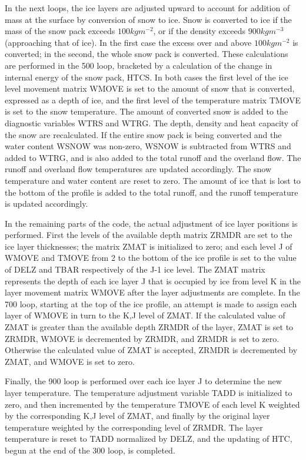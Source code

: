 In the next loops, the ice layers are adjusted upward to account for addition of mass at the surface by conversion of snow to ice. Snow is converted to ice if the mass of the snow pack exceeds $100 kg m^{-2}$, or if the density exceeds $900 kg m^{-3}$ (approaching that of ice). In the first case the excess over and above $100 kg m^{-2}$ is converted; in the second, the whole snow pack is converted. These calculations are performed in the 500 loop, bracketed by a calculation of the change in internal energy of the snow pack, H\+T\+C\+S. In both cases the first level of the ice level movement matrix W\+M\+O\+V\+E is set to the amount of snow that is converted, expressed as a depth of ice, and the first level of the temperature matrix T\+M\+O\+V\+E is set to the snow temperature. The amount of converted snow is added to the diagnostic variables W\+T\+R\+S and W\+T\+R\+G. The depth, density and heat capacity of the snow are recalculated. If the entire snow pack is being converted and the water content W\+S\+N\+O\+W was non-\/zero, W\+S\+N\+O\+W is subtracted from W\+T\+R\+S and added to W\+T\+R\+G, and is also added to the total runoff and the overland flow. The runoff and overland flow temperatures are updated accordingly. The snow temperature and water content are reset to zero. The amount of ice that is lost to the bottom of the profile is added to the total runoff, and the runoff temperature is updated accordingly.

In the remaining parts of the code, the actual adjustment of ice layer positions is performed. First the levels of the available depth matrix Z\+R\+M\+D\+R are set to the ice layer thicknesses; the matrix Z\+M\+A\+T is initialized to zero; and each level J of W\+M\+O\+V\+E and T\+M\+O\+V\+E from 2 to the bottom of the ice profile is set to the value of D\+E\+L\+Z and T\+B\+A\+R respectively of the J-\/1 ice level. The Z\+M\+A\+T matrix represents the depth of each ice layer J that is occupied by ice from level K in the layer movement matrix W\+M\+O\+V\+E after the layer adjustments are complete. In the 700 loop, starting at the top of the ice profile, an attempt is made to assign each layer of W\+M\+O\+V\+E in turn to the K,J level of Z\+M\+A\+T. If the calculated value of Z\+M\+A\+T is greater than the available depth Z\+R\+M\+D\+R of the layer, Z\+M\+A\+T is set to Z\+R\+M\+D\+R, W\+M\+O\+V\+E is decremented by Z\+R\+M\+D\+R, and Z\+R\+M\+D\+R is set to zero. Otherwise the calculated value of Z\+M\+A\+T is accepted, Z\+R\+M\+D\+R is decremented by Z\+M\+A\+T, and W\+M\+O\+V\+E is set to zero.

Finally, the 900 loop is performed over each ice layer J to determine the new layer temperature. The temperature adjustment variable T\+A\+D\+D is initialized to zero, and then incremented by the temperature T\+M\+O\+V\+E of each level K weighted by the corresponding K,J level of Z\+M\+A\+T, and finally by the original layer temperature weighted by the corresponding level of Z\+R\+M\+D\+R. The layer temperature is reset to T\+A\+D\+D normalized by D\+E\+L\+Z, and the updating of H\+T\+C, begun at the end of the 300 loop, is completed.